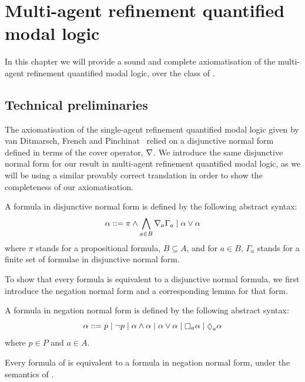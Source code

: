 \chapter{Multi-agent refinement quantified modal logic}\label{k}

In this chapter we will provide a sound and complete axiomatisation of the
multi-agent refinement quantified modal logic, over the class of \classK{}. 

\section{Technical preliminaries}

The axiomatisation of the single-agent refinement quantified modal logic given
by van Ditmarsch, French and Pinchinat~\cite{french2010future} relied on a
disjunctive normal form defined in terms of the cover operator, $\nabla$. We
introduce the same disjunctive normal form for our result in multi-agent
refinement quantified modal logic, as we will be using a similar provably
correct translation in order to show the completeness of our axiomatisation.

\begin{definition}
A formula in disjunctive normal form is defined by the following abstract syntax:
$$
\alpha ::= \pi \land \bigwedge_{a \in B} \nabla_a \Gamma_a \mid \alpha \lor \alpha
$$
where $\pi$ stands for a propositional formula, $B \subseteq A$, and for $a \in
B$, $\Gamma_a$ stands for a finite set of formulae in disjunctive normal form.
\end{definition}

To show that every \lang{} formula is equivalent to a disjunctive normal
formula, we first introduce the negation normal form and a corresponding lemma
for that form.

\begin{definition}
A formula in negation normal form is defined by the following abstract syntax:
$$
\alpha ::= p \bnfalt 
\neg p \bnfalt
\alpha \land \alpha \bnfalt
\alpha \lor \alpha \bnfalt
\knows_a \alpha \bnfalt
\suspects_a \alpha
$$
where $p \in P$ and $a \in A$.
\end{definition}

\begin{lemma}\label{k-nnf}
Every formula of \lang{} is equivalent to a formula in negation normal form,
under the semantics of \logicK{}.
\end{lemma}

